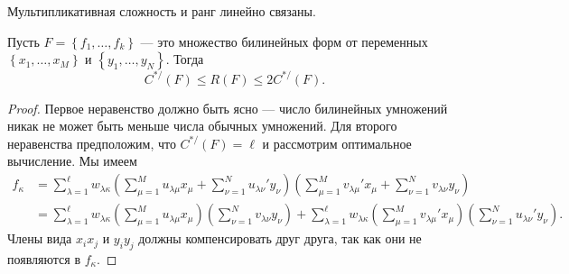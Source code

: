 Мультипликативная сложность и ранг линейно связаны.
\begin{theorem}\label{th:bi:3.7} 
  Пусть $F = \left\{ f_1, \dotsc, f_k \right\}$ --- это множество билинейных форм от переменных $\left\{ x_1, \dotsc, x_M \right\}$ и $\left\{ y_1, \dotsc, y_N \right\}$. Тогда
\[
	C^{*/}(F) \leq R(F) \leq 2 C^{*/}(F).
\]
\end{theorem}
\begin{proof}
  Первое неравенство должно быть ясно --- число билинейных умножений никак не может быть меньше числа обычных умножений. Для второго неравенства предположим, что $C^{*/}(F) = \ell$ и рассмотрим оптимальное вычисление. Мы имеем
\begin{align*}
  f_\kappa & = 
\sum_{\lambda=1}^{\ell} w_{\lambda \kappa} 
\left( \sum_{\mu=1}^{M} u_{\lambda \mu} x_{\mu} + \sum_{\nu=1}^{N} u_{\lambda \nu}' y_{\nu} \right)
\left( \sum_{\mu=1}^{M} v_{\lambda \mu}' x_{\mu} + \sum_{\nu=1}^{N} v_{\lambda \nu} y_{\nu} \right)\\
  & = 
\sum_{\lambda=1}^{\ell} w_{\lambda \kappa} \left( \sum_{\mu=1}^{M} u_{\lambda \mu} x_{\mu} \right) \left( \sum_{\nu=1}^{N} v_{\lambda \nu} y_{\nu} \right) + 
\sum_{\lambda=1}^{\ell} w_{\lambda \kappa} \left( \sum_{\mu=1}^{M} v_{\lambda \mu}' x_{\mu} \right)\left( \sum_{\nu=1}^{N} u_{\lambda \nu}' y_{\nu} \right).
\end{align*}
Члены вида $x_i x_j$ и $y_i y_j$ должны компенсировать друг друга, так как они не появляются в $f_{\kappa}$.
\end{proof}




